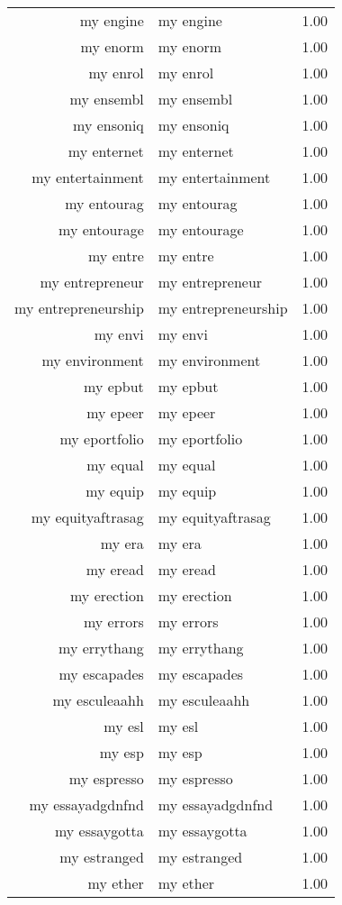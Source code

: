 \begin{table}[ht]
\begin{tabular}{rlr}
  my engine & my engine & 1.00 \\ 
  my enorm & my enorm & 1.00 \\ 
  my enrol & my enrol & 1.00 \\ 
  my ensembl & my ensembl & 1.00 \\ 
  my ensoniq & my ensoniq & 1.00 \\ 
  my enternet & my enternet & 1.00 \\ 
  my entertainment & my entertainment & 1.00 \\ 
  my entourag & my entourag & 1.00 \\ 
  my entourage & my entourage & 1.00 \\ 
  my entre & my entre & 1.00 \\ 
  my entrepreneur & my entrepreneur & 1.00 \\ 
  my entrepreneurship & my entrepreneurship & 1.00 \\ 
  my envi & my envi & 1.00 \\ 
  my environment & my environment & 1.00 \\ 
  my epbut & my epbut & 1.00 \\ 
  my epeer & my epeer & 1.00 \\ 
  my eportfolio & my eportfolio & 1.00 \\ 
  my equal & my equal & 1.00 \\ 
  my equip & my equip & 1.00 \\ 
  my equityaftrasag & my equityaftrasag & 1.00 \\ 
  my era & my era & 1.00 \\ 
  my eread & my eread & 1.00 \\ 
  my erection & my erection & 1.00 \\ 
  my errors & my errors & 1.00 \\ 
  my errythang & my errythang & 1.00 \\ 
  my escapades & my escapades & 1.00 \\ 
  my esculeaahh & my esculeaahh & 1.00 \\ 
  my esl & my esl & 1.00 \\ 
  my esp & my esp & 1.00 \\ 
  my espresso & my espresso & 1.00 \\ 
  my essayadgdnfnd & my essayadgdnfnd & 1.00 \\ 
  my essaygotta & my essaygotta & 1.00 \\ 
  my estranged & my estranged & 1.00 \\ 
  my ether & my ether & 1.00 \\ 

\end{tabular}
\end{table}
